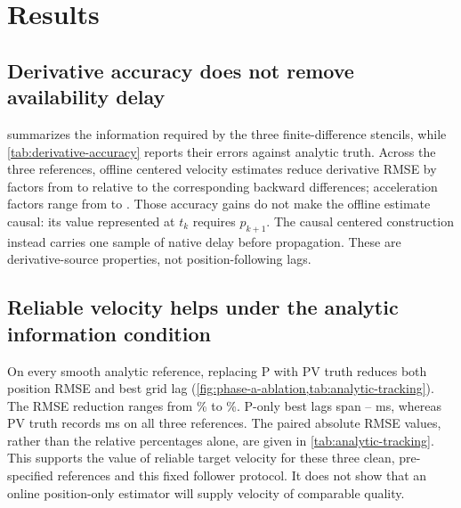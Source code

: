 \section{Results}
\label{sec:results}

\subsection{Derivative accuracy does not remove availability delay}
\label{sec:results-derivatives}

 summarizes the information required by the three
finite-difference stencils, while \cref{tab:derivative-accuracy} reports their
errors against analytic truth.  Across the three references, offline centered
velocity estimates reduce derivative RMSE by factors from
\CenteredVelocityAccuracyFactorMin{} to
\CenteredVelocityAccuracyFactorMax{} relative to the corresponding backward
differences; acceleration factors range from
\CenteredAccelerationAccuracyFactorMin{} to
\CenteredAccelerationAccuracyFactorMax{}.  Those accuracy gains do not make
the offline estimate causal: its value represented at \(t_k\) requires
\(p_{k+1}\).  The causal centered construction instead carries one sample of
native delay before propagation.  These are derivative-source properties, not
position-following lags.

\begin{table}[t]
  \centering
  \caption{Derivative accuracy on the three analytic references.  Velocity
  RMSE is in \si{\radian\per\second}; acceleration RMSE is in
  \si{\radian\per\second\squared}.  ``Centered offline'' consumes one future
  sample, whereas ``centered causal'' has one-sample native delay and is
  propagated to the latest sample.}
  \label{tab:derivative-accuracy}
  \small
  
\end{table}

\subsection{Reliable velocity helps under the analytic information condition}
\label{sec:results-analytic}

On every smooth analytic reference, replacing P with PV truth reduces both
position RMSE and best grid lag
(\cref{fig:phase-a-ablation,tab:analytic-tracking}).  The RMSE reduction ranges from
\AnalyticVelocityImprovementMin\% to
\AnalyticVelocityImprovementMax\%.  P-only best lags span
\AnalyticPOnlyLagMinMS--\AnalyticPOnlyLagMaxMS{} ms, whereas PV truth records
\AnalyticPVLagMS{} ms on all three references.  The paired absolute RMSE
values, rather than the relative percentages alone, are given in
\cref{tab:analytic-tracking}.  This supports the value of reliable target
velocity for these three clean, pre-specified references and this fixed
follower protocol.  It does not show that an online position-only estimator
will supply velocity of comparable quality.

